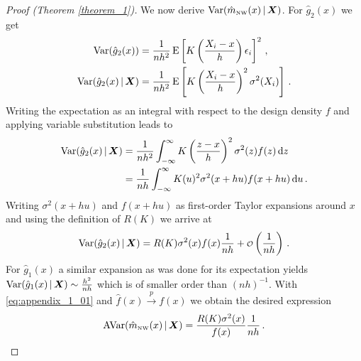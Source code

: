 \begin{proof}[Proof (Theorem \ref{theorem_1})]
	We now derive $\operatorname{Var}(\hat{m}_{\textup{\tiny NW}}(x) \,|\, \bm{X})$.
	For $\hat{g}_2(x)$ we get
	\begin{align}
		\operatorname{Var}(\hat{g}_2(x)) &= \frac{1}{nh^2} \operatorname{E} \left[ K \left( \frac{X_i - x}{h} \right) \epsilon_i \right]^2 \,, \\
		\operatorname{Var}(\hat{g}_2(x) \,|\, \bm{X}) &= \frac{1}{nh^2} \operatorname{E} \left[ K \left( \frac{X_i - x}{h} \right)^2 \sigma^2(X_i) \right] \,.
	\end{align}
	Writing the expectation as an integral with respect to the design density $f$ and applying variable substitution leads to
	\begin{align}
		\operatorname{Var}(\hat{g}_2(x) \,|\, \bm{X}) &= \frac{1}{nh^2} \int_{-\infty}^{\infty} K \left( \frac{z - x}{h} \right)^2 \sigma^2(z) f(z) \mathop{}\!\textup{d} z \\
		&= \frac{1}{nh} \int_{-\infty}^{\infty} K(u)^2 \sigma^2(x + hu) f(x + hu) \mathop{}\!\textup{d} u \,.
	\end{align}
	Writing $\sigma^2(x + hu)$ and $f(x + hu)$ as first-order Taylor expansions around $x$ and using the definition of $R(K)$ we arrive at
	\begin{equation}
		\operatorname{Var}(\hat{g}_2(x) \,|\, \bm{X}) = R(K) \sigma^2(x) f(x) \frac{1}{nh} + \operatorname{\scriptstyle \mathcal{O}} \left( \frac{1}{nh} \right) \,.
	\end{equation}
	For $\hat{g}_1(x)$ a similar expansion as was done for its expectation yields $\operatorname{Var}(\hat{g}_1(x) \,|\, \bm{X}) \sim \frac{h^2}{nh}$ which is of smaller order than $(nh)^{-1}$.
	With \eqref{eq:appendix_1_01} and $\hat{f}(x) \overset{p}{\longrightarrow} f(x)$ we obtain the desired expression
	\begin{equation}
		\operatorname{AVar} (\hat{m}_{\textup{\tiny NW}}(x) \,|\, \bm{X}) = \frac{R(K) \sigma^2(x)}{f(x)} \frac{1}{nh} \,.
	\end{equation} 
\end{proof}

